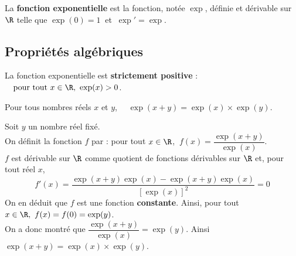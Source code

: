 \documentclass[a4paper,11pt,cours]{nsi} %
\begin{document}
\begin{definition}[ ]
	La \textbf{fonction exponentielle} est la fonction, notée $\exp$, définie et dérivable sur $\R$ telle que $\exp(0)=1 \ $ et $\ \exp'=\exp$.
\end{definition}



\subsection*{Propriétés algébriques}
\begin{propriete}[ ]
	La fonction exponentielle est \textbf{strictement positive} : $\quad \text{pour tout } x\in \R,\ \exp(x)>0$.
\end{propriete}



\begin{propriete}
	Pour tous nombres réels $x$ et $y$, $\quad \boxed{\exp(x+y)=\exp(x)\times \exp(y)}$.
\end{propriete}
\begin{demonstration}
	Soit $y$ un nombre réel fixé.\\
	On définit la fonction $f$ par : pour tout $x\in \R$, $\ f(x)=\dfrac{\exp(x+y)}{\exp(x)}$.\\
	$f$ est dérivable sur $\R$ comme quotient de fonctions dérivables sur $\R$ et, pour tout réel $x$, $$f'(x)=\dfrac{\exp(x+y)\exp(x)-\exp(x+y)\exp(x)}{\left[\exp(x)\right]^2}=0$$
	On en déduit que $f$ est une fonction \textbf{constante}. Ainsi, pour tout $x\in \R, \ f(x)=f(0)=\exp(y)$.\\
	On a donc montré que $\dfrac{\exp(x+y)}{\exp(x)}=\exp(y)$. Ainsi $\exp(x+y)=\exp(x)\times\exp(y)$.
\end{demonstration}
\end{document}
